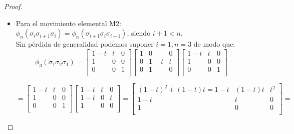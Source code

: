 \begin{proof}
\begin{itemize}
	 	 \item Para el movimiento elemental M2: \\
	  	 $ \phi_{n}(\sigma_{i}\sigma_{i+1}\sigma_{i}) = \phi_{n}(\sigma_{i+1}\sigma_{i}\sigma_{i+1})$, siendo $ i+1<n $.\\
	  	 Sin pérdida de generalidad podemos suponer $i=1, n=3$ de modo que:
	  	 	\[ \phi_{3}(\sigma_{1}\sigma_{2}\sigma_{1}) = 
	  	 	\begin{bmatrix}
	  	 	  1-t & t & 0  \\
	  	 	  1 & 0 & 0 \\
	  	 	  0 & 0 & 1 \\
	  	 	\end{bmatrix}\begin{bmatrix}
	  	 	1 & 0 & 0 \\
	  	 	0 & 1-t & t \\
	  	 	0 & 1 & 0 \\
	  	 	\end{bmatrix}\begin{bmatrix}
	  	 	1-t & t & 0  \\
	  	 	1 & 0 & 0 \\
	  	 	0 & 0 & 1 \\
	  	 	\end{bmatrix}=\]
	  	 	
	  	 	\[ = 
	  	 	\begin{bmatrix}
	  	 	1-t & t & 0  \\
	  	 	1 & 0 & 0 \\
	  	 	0 & 0 & 1 \\
	  	 	\end{bmatrix}\begin{bmatrix}
	  	 	1-t & t & 0  \\
	  	 	1-t & 0 & t \\
	  	 	1 & 0 & 0 \\
	  	 	\end{bmatrix}=
	  	 	\begin{bmatrix}
	  	 	(1-t)^{2}+(1-t)t = 1-t & (1-t)t & t^{2}  \\
	  	 	1-t & t & 0 \\
	  	 	1 & 0 & 0 \\
	  	 	\end{bmatrix}=\]
	  	 	

\end{itemize}
\end{proof}
